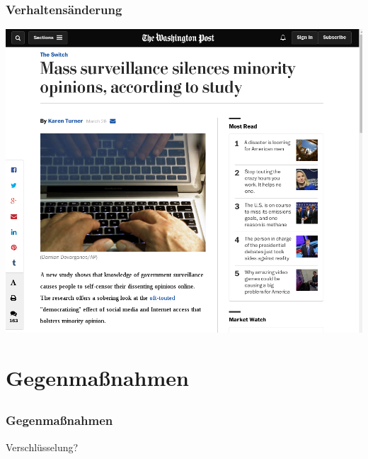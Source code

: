 \documentclass[12pt]{beamer}
\begin{document}
\begin{frame}
  \frametitle{Verhaltensänderung}
  \begin{center}
    \includegraphics[height=0.7\textheight]{img/verhalten.png}
  \end{center}
\end{frame}

\section{Gegenmaßnahmen}
\subsection{}

\begin{frame}
  \frametitle{Gegenmaßnahmen}
  \pause
  \begin{center}
    \large Verschlüsselung?
  \end{center}
\end{frame}
\end{document}
